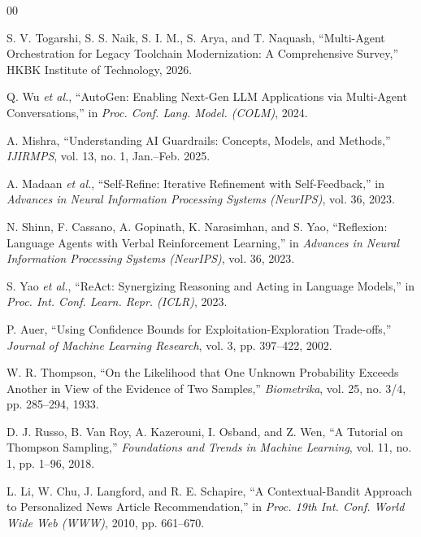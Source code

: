 \documentclass[conference]{IEEEtran}
\begin{document}
\begin{thebibliography}{00}

 S. V. Togarshi, S. S. Naik, S. I. M., S. Arya, and T.
Naquash, ``Multi-Agent Orchestration for Legacy Toolchain Modernization: A
Comprehensive Survey,'' HKBK Institute of Technology, 2026.

 Q. Wu \emph{et al.}, ``AutoGen: Enabling Next-Gen LLM
Applications via Multi-Agent Conversations,'' in \emph{Proc. Conf. Lang.
Model. (COLM)}, 2024.

 A. Mishra, ``Understanding AI Guardrails: Concepts,
Models, and Methods,'' \emph{IJIRMPS}, vol. 13, no. 1, Jan.--Feb. 2025.

 A. Madaan \emph{et al.}, ``Self-Refine: Iterative
Refinement with Self-Feedback,'' in \emph{Advances in Neural Information
Processing Systems (NeurIPS)}, vol. 36, 2023.

 N. Shinn, F. Cassano, A. Gopinath, K. Narasimhan, and S.
Yao, ``Reflexion: Language Agents with Verbal Reinforcement Learning,'' in
\emph{Advances in Neural Information Processing Systems (NeurIPS)}, vol. 36,
2023.

 S. Yao \emph{et al.}, ``ReAct: Synergizing Reasoning and
Acting in Language Models,'' in \emph{Proc. Int. Conf. Learn. Repr. (ICLR)},
2023.

 P. Auer, ``Using Confidence Bounds for Exploitation-Exploration
Trade-offs,'' \emph{Journal of Machine Learning Research}, vol. 3, pp.
397--422, 2002.

 W. R. Thompson, ``On the Likelihood that One Unknown
Probability Exceeds Another in View of the Evidence of Two Samples,''
\emph{Biometrika}, vol. 25, no. 3/4, pp. 285--294, 1933.

 D. J. Russo, B. Van Roy, A. Kazerouni, I. Osband,
and Z. Wen, ``A Tutorial on Thompson Sampling,'' \emph{Foundations and
Trends in Machine Learning}, vol. 11, no. 1, pp. 1--96, 2018.

 L. Li, W. Chu, J. Langford, and R. E. Schapire, ``A
Contextual-Bandit Approach to Personalized News Article Recommendation,'' in
\emph{Proc. 19th Int. Conf. World Wide Web (WWW)}, 2010, pp. 661--670.

\end{thebibliography}
\end{document}
